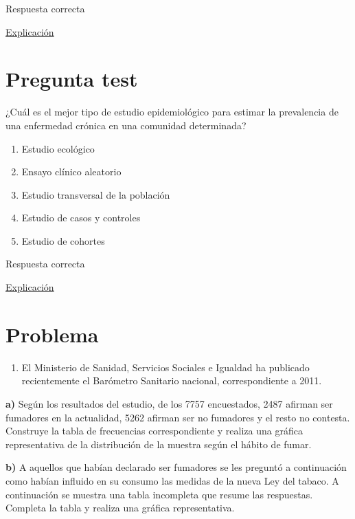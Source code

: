 \documentclass[
]{book}
\providecommand{\tightlist}{%
  \setlength{\itemsep}{0pt}\setlength{\parskip}{0pt}}
\begin{document}
Respuesta correcta

\href{https://1fjmanzano.github.io/bioestadistica/tipos-de-variables.html}{Explicación}

\hypertarget{pregunta-test-2}{%
\section{Pregunta test}\label{pregunta-test-2}}

¿Cuál es el mejor tipo de estudio epidemiológico para estimar la prevalencia de una enfermedad crónica en una comunidad determinada?

\begin{enumerate}
\def\labelenumi{\alph{enumi})}
\tightlist
\item
  Estudio ecológico
\item
  Ensayo clínico aleatorio
\item
  Estudio transversal de la población
\item
  Estudio de casos y controles
\item
  Estudio de cohortes
\end{enumerate}

Respuesta correcta

\href{https://escuelitamedica.com/2019/02/03/tipos-de-estudios-epidemiologicos-preguntas/}{Explicación}

\hypertarget{problema}{%
\section{Problema}\label{problema}}

\begin{enumerate}
\def\labelenumi{\arabic{enumi}.}
\tightlist
\item
  El Ministerio de Sanidad, Servicios Sociales e Igualdad ha publicado recientemente el Barómetro Sanitario nacional, correspondiente a 2011.
\end{enumerate}

\textbf{a)} Según los resultados del estudio, de los 7757 encuestados, 2487 afirman ser fumadores en la actualidad, 5262 afirman ser no fumadores y el resto no contesta. Construye la tabla de frecuencias correspondiente y realiza una gráfica representativa de la distribución de la muestra según el hábito de fumar.

\textbf{b)} A aquellos que habían declarado ser fumadores se les preguntó a continuación como habían influido en su consumo las medidas de la nueva Ley del tabaco. A continuación se muestra una tabla incompleta que resume las respuestas. Completa la tabla y realiza una gráfica representativa.
\end{document}
